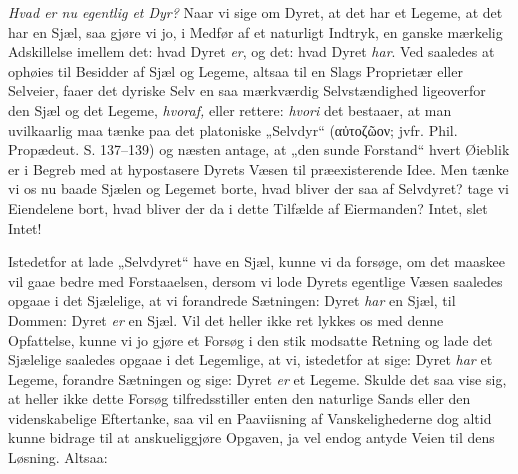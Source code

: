 \documentclass[12pt,a4paper]{book}
\begin{document}
\emph{Hvad er nu egentlig et Dyr?} Naar vi sige om Dyret, at det har et Legeme,
at det har en Sjæl, saa gjøre vi jo, i Medfør af et naturligt Indtryk, en ganske
mærkelig Adskillelse imellem det: hvad Dyret \emph{er}, og det: hvad Dyret
\emph{har}. Ved saaledes at ophøies til Besidder af Sjæl og Legeme, altsaa til
en Slags Proprietær eller Selveier, faaer det dyriske Selv en saa mærkværdig
Selvstændighed ligeoverfor den Sjæl og det Legeme, \emph{hvoraf,} eller rettere:
\emph{hvori} det bestaaer, at man uvilkaarlig maa tænke paa det platoniske
„Selvdyr“ (αὐτοζῶον; jvfr. Phil. Propædeut. S. 137--139) og næsten antage, at
„den sunde Forstand“ hvert Øieblik er i Begreb med at hypostasere Dyrets Væsen
til præexisterende Idee. Men tænke vi os nu baade Sjælen og Legemet borte, hvad
bliver der saa af Selvdyret? tage vi Eiendelene bort, hvad bliver der da i dette
Tilfælde af Eiermanden? Intet, slet Intet!

Istedetfor at lade „Selvdyret“ have en Sjæl, kunne vi da forsøge, om det maaskee
vil gaae bedre med Forstaaelsen, dersom vi lode Dyrets egentlige Væsen saaledes
opgaae i det Sjælelige, at vi forandrede Sætningen: Dyret \emph{har} en Sjæl,
til Dommen: Dyret \emph{er} en Sjæl. Vil det heller ikke ret lykkes os med denne
Opfattelse, kunne vi jo gjøre et Forsøg i den stik modsatte Retning og lade det
Sjælelige saaledes opgaae i det Legemlige, at vi, istedetfor at sige: Dyret
\emph{har} et Legeme, forandre Sætningen og sige: Dyret \emph{er} et Legeme.
Skulde det saa vise sig, at heller ikke dette Forsøg tilfredsstiller enten den
naturlige Sands eller den videnskabelige Eftertanke, saa vil en Paaviisning af
Vanskelighederne dog altid kunne bidrage til at anskueliggjøre Opgaven, ja vel
endog antyde Veien til dens Løsning. Altsaa:
\end{document}
